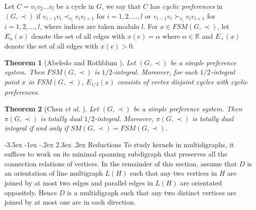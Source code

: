 \documentclass[11pt]{article}
\makeatletter
\newtheorem{theorem}{Theorem}%
\numberwithin{theorem}{section}
\renewcommand\section{%
  \@startsection{section}{1}
                {\z@}%
                {-3.5ex \@plus -1ex \@minus -.2ex}%
                {2.3ex \@plus.2ex}%
                {\large\bfseries}%
}
\makeatother
\begin{document}
Let $C=v_1 v_2 \ldots v_l$ be a cycle in $G$, we say that $C$ has \textit{cyclic preferences} in $(G,\prec)$ if
$v_{i-1} v_i \prec_{v_i} v_i v_{i+1}$ for $i=1,2,\ldots,l$
or $v_{i-1} v_i\succ_{v_i} v_i v_{i+1}$ for $i=1,2,\ldots,l$,
where indices are taken modulo $l$.
For $x\in FSM(G,\prec)$, let $E_{\alpha}(x)$ denote the set of all edges with $x(e)=\alpha$ where $\alpha\in\mathbb{R}$ and $E_+(x)$ denote the set of all edges with $x(e)>0$.

\begin{theorem}[Abeledo and Rothblum \cite{AbelRoth94}]
\label{thm:AbelRoth94}
Let $(G,\prec)$ be a simple preference system. Then $FSM(G,\prec)$ is $1/2$-integral. Moreover, for each $1/2$-integral point $x$ in $FSM(G,\prec)$, $E_{1/2}(x)$ consists of vertex disjoint cycles with cyclic preferences.
\end{theorem} 

\begin{theorem}[Chen \textit{et al.} \cite{ChenDing12}]
\label{thm:ChenDing12}
Let $(G,\prec)$ be a simple preference system. Then $\pi(G,\prec)$ is totally dual $1/2$-integral. Moreover, $\pi(G,\prec)$ is totally dual integral if and only if $SM(G,\prec)=FSM(G,\prec)$.
\end{theorem}

\section{Reductions}
To study kernels in multidigraphs, it suffices to work on its minimal spanning subdigraph that  preserves all the connection relations of vertices. In the remainder of this section, assume that $D$ is an orientation of line multigraph $L(H)$ such that any two vertices in $H$ are joined by at most two edges and parallel edges in $L(H)$ are orientated oppositely. Hence $D$ is a multidigraph such that any two distinct vertices are joined by at most one arc in each direction.
\end{document}
